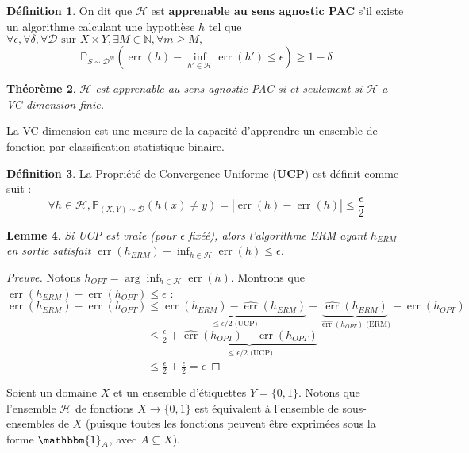 \documentclass{article}
\DeclareMathOperator{\err}{err}
\theoremstyle{plain}
\newtheorem{thrm}{Théorème}[section]
\newtheorem{lem}[thrm]{Lemme}
\theoremstyle{remark}
\theoremstyle{definition}
\newtheorem{defin}[thrm]{Définition}
\begin{document}
\begin{defin}
    On dit que $\mathcal{H}$ est \textbf{apprenable au sens agnostic PAC} s'il existe un algorithme calculant une hypothèse $h$ tel que $ \forall\epsilon , \forall\delta , \forall\mathcal{D} \text{ sur } X\times Y, \exists M\in\mathbb{N}, \forall m\geq M,$
    $$ \mathbb{P}_{S\sim\mathcal{D}^m} (\err(h)-\inf_{h'\in\mathcal{H}} \err(h')\leq \epsilon ) \geq 1- \delta $$
\end{defin}

\begin{thrm}
    $\mathcal{H}$ est apprenable au sens agnostic PAC si et seulement si $\mathcal{H}$ a VC-dimension finie.
\end{thrm}

La VC-dimension est une mesure de la capacité d'apprendre un ensemble de fonction par classification statistique binaire.

\begin{defin}
    La Propriété de Convergence Uniforme (\textbf{UCP}) est définit comme suit :
    $$ \forall h\in\mathcal{H}, \mathbb{P}_{(X,Y)\sim\mathcal{D}} (h(x) \neq y) = | \err(h) - \widehat{\err}(h)| \leq \frac{\epsilon}{2} $$
\end{defin}

\begin{lem}
    Si UCP est vraie (pour $\epsilon$ fixéé), alors l'algorithme ERM ayant $h_{ERM}$ en sortie satisfait $\err(h_{ERM}) - \inf_{h\in\mathcal{H}} \err(h) \leq \epsilon$.
\end{lem}

\begin{proof}[Preuve]
Notons $h_{OPT} = \arg\inf_{h\in\mathcal{H}} \err(h)$. Montrons que $\err(h_{ERM})-\err(h_{OPT}) \leq \epsilon$ :\\
$\err(h_{ERM})-\err(h_{OPT}) \leq \underbrace{\err(h_{ERM}) - \widehat{\err}(h_{ERM})}_{\leq \epsilon / 2 \text{ (UCP)}} + \underbrace{\widehat{\err}(h_{ERM})}_{\widehat{\err}(h_{OPT})\text{ (ERM)}} - \err(h_{OPT})$\\
$\phantom{\err(h_{ERM})-\err(h_{OPT})} \leq \frac{\epsilon}{2} + \underbrace{\widehat{\err}(h_{OPT}) - \err(h_{OPT})}_{\leq \epsilon / 2 \text{ (UCP)}}$\\
$\phantom{\err(h_{ERM})-\err(h_{OPT})} \leq \frac{\epsilon}{2} + \frac{\epsilon}{2} = \epsilon $
\end{proof}

Soient un domaine $X$ et un ensemble d'étiquettes $Y=\{0,1\}$. Notons que l'ensemble $\mathcal{H}$ de fonctions $X \rightarrow \{0,1\}$ est équivalent à l'ensemble de sous-ensembles de $X$ (puisque toutes les fonctions peuvent être exprimées sous la forme $\mathbbm{1}_A$, avec $A\subseteq X$).
\end{document}

